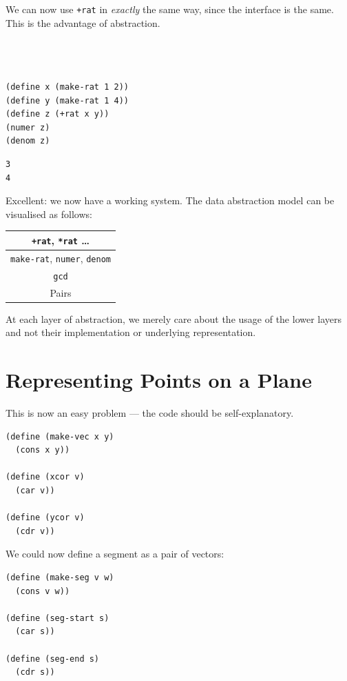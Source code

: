 \documentclass[9pt]{report}
\begin{document}
We can now use \texttt{+rat} in \emph{exactly} the same way, since the
interface is the same. This is the advantage of abstraction.

\begin{verbatim}



(define x (make-rat 1 2))
(define y (make-rat 1 4))
(define z (+rat x y))
(numer z)
(denom z)
\end{verbatim}

\begin{verbatim}
3
4
\end{verbatim}


Excellent: we now have a working system. The data abstraction
model can be visualised as follows:

\begin{center}
\begin{tabular}{c}
\toprule
\texttt{+rat}, \texttt{*rat} \ldots{}\\
\midrule
\texttt{make-rat}, \texttt{numer}, \texttt{denom}\\
\midrule
\texttt{gcd}\\
\midrule
Pairs\\
\bottomrule
\end{tabular}
\end{center}

At each layer of abstraction, we merely care about the usage of
the lower layers and not their implementation or underlying
representation.

\section{Representing Points on a Plane}
\label{sec:org3723b5f}

This is now an easy problem --- the code should be
self-explanatory.

\begin{verbatim}
(define (make-vec x y)
  (cons x y))

(define (xcor v)
  (car v))

(define (ycor v)
  (cdr v))
\end{verbatim}

We could now define a segment as a pair of vectors:

\begin{verbatim}
(define (make-seg v w)
  (cons v w))

(define (seg-start s)
  (car s))

(define (seg-end s)
  (cdr s))
\end{verbatim}
\end{document}
